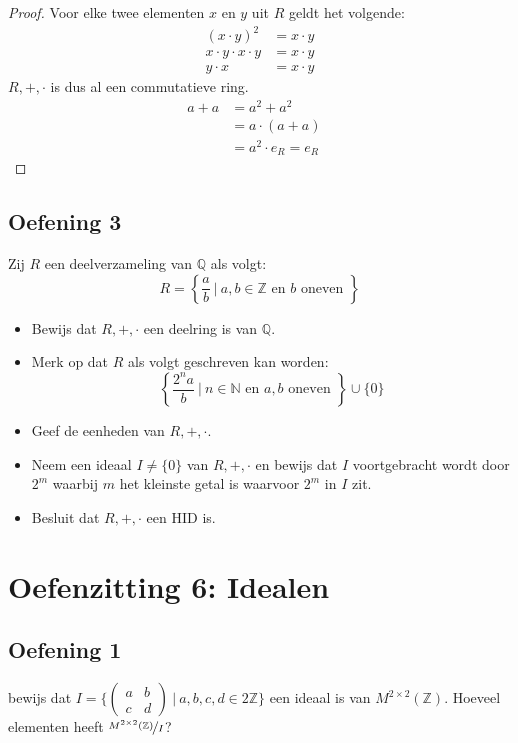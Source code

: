 \documentclass[main.tex]{subfiles}
\begin{document}
\begin{proof}
  Voor elke twee elementen $x$ en $y$ uit $R$ geldt het volgende:
  \[
  \begin{array}{rl}
    (x \cdot y)^{2} &= x \cdot y\\
    x \cdot y \cdot x \cdot y &= x \cdot y\\
    y \cdot x &= x \cdot y
  \end{array}
  \]
  $R,+,\cdot$ is dus al een commutatieve ring.
  \[
  \begin{array}{rll}
    a + a &= a^{2} + a^{2} &\\
          &= a \cdot (a+a) &\\
          &= a^{2} \cdot e_{R} = e_{R}
  \end{array}
  \]
\end{proof}


\subsection*{Oefening 3}
Zij $R$ een deelverzameling van $\mathbb{Q}$ als volgt:
\[ R = \left\{ \frac{a}{b} \ |\ a,b \in \mathbb{Z} \text{ en } b \text{ oneven } \right\} \]
\begin{itemize}
\item Bewijs dat $R,+,\cdot$ een deelring is van $\mathbb{Q}$.
\item Merk op dat $R$ als volgt geschreven kan worden:
  \[ \left\{ \frac{2^{n}a}{b}\ |\ n\in \mathbb{N}\text{ en } a,b \text { oneven } \right\} \cup \{0\} \]
\item Geef de eenheden van $R,+,\cdot$.
\item Neem een ideaal $I \neq \{0\}$ van $R,+,\cdot$ en bewijs dat $I$ voortgebracht wordt door $2^{m}$ waarbij $m$ het kleinste getal is waarvoor $2^{m}$ in $I$ zit.
\item Besluit dat $R,+,\cdot$ een HID is.
\end{itemize}

\section{Oefenzitting 6: Idealen}

\subsection*{Oefening 1}
bewijs dat $I=\{  \begin{pmatrix}    a & b\\c & d  \end{pmatrix} \ |\ a,b,c,d \in 2\mathbb{Z}\}$ een ideaal is van $M^{2\times 2}(\mathbb{Z})$. Hoeveel elementen heeft $\nicefrac{M^{2\times 2}(\mathbb{Z})}{I}$?
\end{document}
